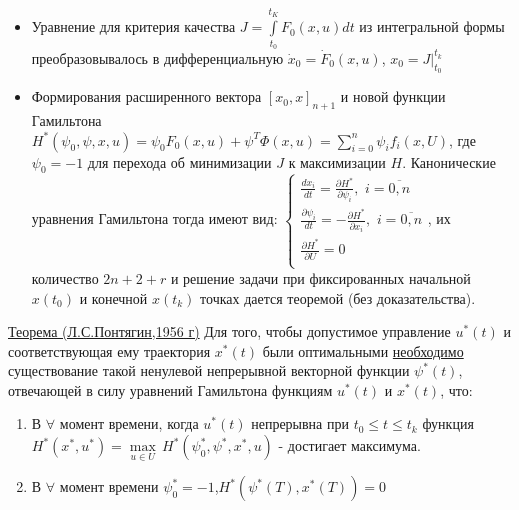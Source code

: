 \documentclass[preprint,russian,a5paper,10pt,twoside,mediummath]{ncc}
\begin{document}
\begin{itemize}
\item Уравнение для критерия качества $J=\int\limits_{{{t}_{0}}}^{{{t}_{K}}}{{{F}_{0}}\left( x,u \right)dt}$ из интегральной формы преобразовывалось в дифференциальную ${{\dot{x}}_{0}}={{\dot{F}}_{0}}\left( x,u \right)$, ${{x}_{0}}=\left. J \right|_{{{t}_{0}}}^{{{t}_{k}}}$
\item Формирования расширенного вектора ${{\left[ {{x}_{0}},x \right]}_{n+1}}$ и новой функции Гамильтона ${{H}^{*}}\left( {{\psi }_{0}},\psi ,x,u \right)={{\psi }_{0}}{{F}_{0}}\left( x,u \right)+{{\psi }^{T}}\Phi \left( x,u \right)=\sum\limits_{i=0}^{n}{{{\psi }_{i}}{{f}_{i}}\left( x,U \right)}$, где ${{\psi }_{0}}=-1$ для перехода об минимизации $J$ к максимизации $H$.
Канонические уравнения Гамильтона тогда имеют вид:
$\left\{ \begin{array}{*{35}{l}}
   \frac{d{{x}_{i}}}{dt}=\frac{\partial {{H}^{*}}}{\partial {{\psi }_{i}}},\,\,i=\overline{0,n}  \\
   \frac{\partial {{\psi }_{i}}}{dt}=-\frac{\partial {{H}^{*}}}{\partial {{x}_{i}}},\,\,i=\overline{0,n}  \\
   \frac{\partial {{H}^{*}}}{\partial U}=0  \\
\end{array} \right.$, их количество $2n+2+r$ и решение задачи при фиксированных начальной $x\left( {{t}_{0}} \right)$ и конечной $x\left( {{t}_{k}} \right)$ точках дается теоремой (без доказательства).
\end{itemize}
\underline{Теорема (Л.С.Понтягин,1956 г)} Для того, чтобы допустимое управление ${{u}^{*}}\left( t \right)$ и соответствующая ему траектория ${{x}^{*}}\left( t \right)$ были оптимальными \underline{необходимо} существование такой ненулевой непрерывной векторной функции ${{\psi }^{*}}\left( t \right)$, отвечающей в силу уравнений Гамильтона функциям  ${{u}^{*}}\left( t \right)$ и ${{x}^{*}}\left( t \right)$, что:
\begin{enumerate}
\item В $\forall $ момент времени, когда ${{u}^{*}}\left( t \right)$ непрерывна при ${{t}_{0}}\le t\le {{t}_{k}}$ функция ${{H}^{*}}\left( {{x}^{*}},{{u}^{*}} \right)=\underset{u\in U}{\mathop{\max }}\,{{H}^{*}}\left( \psi _{0}^{*},{{\psi }^{*}},{{x}^{*}},u \right)$ - достигает максимума.
\item В $\forall $ момент времени $\psi _{0}^{*}=-1$,${{H}^{*}}\left( {{\psi }^{*}}\left( T \right),{{x}^{*}}\left( T \right) \right)=0$
\end{enumerate}
\end{document}
